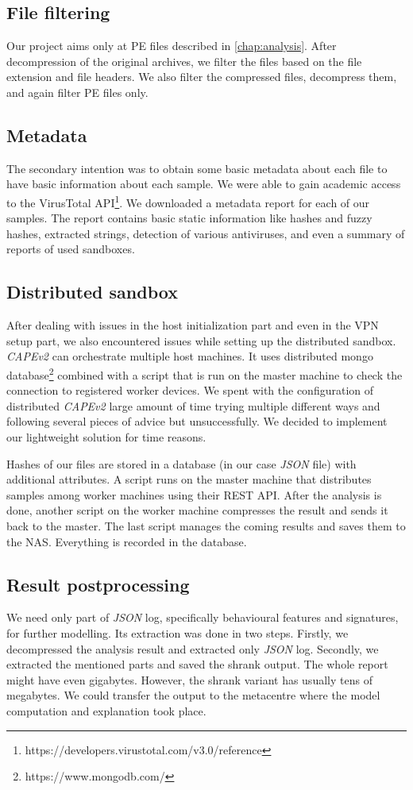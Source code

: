 \subsection{File filtering}
Our project aims only at PE files described in \ref{chap:analysis}. After decompression of the original archives, we filter the files based on the file extension and file headers. We also filter the compressed files, decompress them, and again filter PE files only.

\subsection{Metadata}
The secondary intention was to obtain some basic metadata about each file to have basic information about each sample. We were able to gain academic access to the VirusTotal API\footnote{https://developers.virustotal.com/v3.0/reference}. We downloaded a metadata report for each of our samples. The report contains basic static information like hashes and fuzzy hashes, extracted strings, detection of various antiviruses, and even a summary of reports of used sandboxes.

\subsection{Distributed sandbox}
After dealing with issues in the host initialization part and even in the VPN setup part, we also encountered issues while setting up the distributed sandbox. \emph{CAPEv2} can orchestrate multiple host machines. It uses distributed mongo database\footnote{https://www.mongodb.com/} combined with a script that is run on the master machine to check the connection to registered worker devices. We spent with the configuration of distributed \emph{CAPEv2} large amount of time trying multiple different ways and following several pieces of advice but unsuccessfully. We decided to implement our lightweight solution for time reasons.

Hashes of our files are stored in a database (in our case \emph{JSON} file) with additional attributes. A script runs on the master machine that distributes samples among worker machines using their REST API. After the analysis is done, another script on the worker machine compresses the result and sends it back to the master. The last script manages the coming results and saves them to the NAS. Everything is recorded in the database.

\subsection{Result postprocessing}
We need only part of \emph{JSON} log, specifically behavioural features and signatures, for further modelling. Its extraction was done in two steps. Firstly, we decompressed the analysis result and extracted only \emph{JSON} log. Secondly, we extracted the mentioned parts and saved the shrank output. The whole report might have even gigabytes. However, the shrank variant has usually tens of megabytes. We could transfer the output to the metacentre where the model computation and explanation took place.

